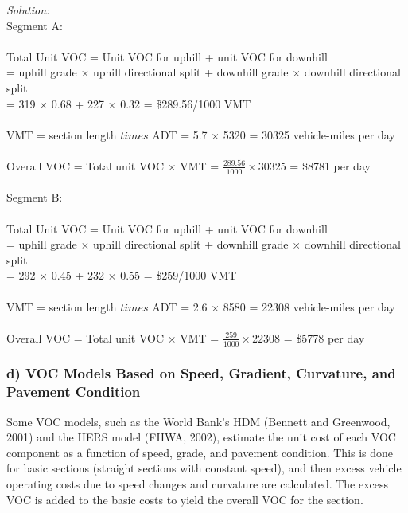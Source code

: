 \textit{Solution:}\\
Segment A:\\\\
Total Unit VOC = Unit VOC for uphill + unit VOC for downhill\\
\hspace*{2cm} = uphill grade $ \times $ uphill directional split + downhill grade $ \times $ downhill directional split\\
\hspace*{2cm} = 319 $ \times $ 0.68 + 227 $ \times $ 0.32 = \$289.56/1000 VMT\\\\
VMT = section length $ times $ ADT = 5.7 $ \times $ 5320 = 30325 vehicle-miles per day\\\\
Overall VOC = Total unit VOC $ \times$ VMT = $ \frac{289.56}{1000} \times 30325 $ = \$8781 per day\\\\
Segment B:\\\\
Total Unit VOC = Unit VOC for uphill + unit VOC for downhill\\
\hspace*{2cm} = uphill grade $ \times $ uphill directional split + downhill grade $ \times $ downhill directional split\\
\hspace*{2cm} = 292 $ \times $ 0.45 + 232 $ \times $ 0.55 = \$259/1000 VMT\\\\
VMT = section length $ times $ ADT = 2.6 $ \times $ 8580 = 22308 vehicle-miles per day\\\\
Overall VOC = Total unit VOC $ \times$ VMT = $ \frac{259}{1000} \times 22308 $ = \$5778 per day
\subsubsection{d) VOC Models Based on Speed, Gradient, Curvature, and Pavement Condition}
Some VOC models, such as the World Bank’s HDM (Bennett and Greenwood, 2001) and the HERS model (FHWA, 2002), estimate the unit cost of each VOC component as a function of speed, grade, and pavement condition. This is done for basic sections (straight sections with constant speed), and then excess vehicle operating costs due to speed changes and curvature are calculated. The excess VOC is added to the basic costs to yield the overall VOC for the section.
